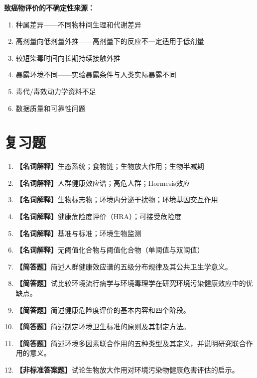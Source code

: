 \documentclass[10pt,a4paper,oneside]{ctexbook}
\begin{document}
\begin{tipbox}
\textbf{致癌物评价的不确定性来源：}
\begin{enumerate}[leftmargin=*]
    \item 种属差异——不同物种间生理和代谢差异
    \item 高剂量向低剂量外推——高剂量下的反应不一定适用于低剂量
    \item 较短染毒时间向长期持续接触外推
    \item 暴露环境不同——实验暴露条件与人类实际暴露不同
    \item 毒代/毒效动力学资料不足
    \item 数据质量和可靠性问题
\end{enumerate}
\end{tipbox}

\section{复习题}

\begin{enumerate}[leftmargin=*, itemsep=8pt]
    \item \textbf{【名词解释】}生态系统；食物链；生物放大作用；生物半减期
    \item \textbf{【名词解释】}人群健康效应谱；高危人群；Hormesis效应
    \item \textbf{【名词解释】}生物标志物；环境内分泌干扰物；环境基因交互作用
    \item \textbf{【名词解释】}健康危险度评价（HRA）；可接受危险度
    \item \textbf{【名词解释】}基准与标准；环境生物监测
    \item \textbf{【名词解释】}无阈值化合物与阈值化合物（单阈值与双阈值）
    \item \textbf{【简答题】}简述人群健康效应谱的五级分布规律及其公共卫生学意义。
    \item \textbf{【简答题】}试比较环境流行病学与环境毒理学在研究环境污染健康效应中的优缺点。
    \item \textbf{【简答题】}简述健康危险度评价的基本内容和四个阶段。
    \item \textbf{【简答题】}简述制定环境卫生标准的原则及其制定方法。
    \item \textbf{【简答题】}简述环境多因素联合作用的五种类型及其定义，并说明研究联合作用的意义。
    \item \textbf{【非标准答案题】}试论生物放大作用对环境污染物健康危害评估的启示。
\end{enumerate}
\end{document}
